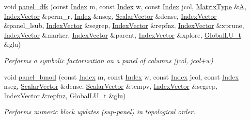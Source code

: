 \begin{DoxyCompactItemize}
void \hyperlink{group___sparse_l_u___module_acaf62fda387ea03e9caa2734e4e7b0c9}{panel\+\_\+dfs} (const \hyperlink{namespace_eigen_a62e77e0933482dafde8fe197d9a2cfde}{Index} m, const \hyperlink{namespace_eigen_a62e77e0933482dafde8fe197d9a2cfde}{Index} w, const \hyperlink{namespace_eigen_a62e77e0933482dafde8fe197d9a2cfde}{Index} jcol, \hyperlink{group___sparse_core___module}{Matrix\+Type} \&\hyperlink{group___core___module_class_eigen_1_1_matrix}{A}, \hyperlink{group___core___module}{Index\+Vector} \&perm\+\_\+r, \hyperlink{namespace_eigen_a62e77e0933482dafde8fe197d9a2cfde}{Index} \&nseg, \hyperlink{group___core___module}{Scalar\+Vector} \&dense, \hyperlink{group___core___module}{Index\+Vector} \&panel\+\_\+lsub, \hyperlink{group___core___module}{Index\+Vector} \&segrep, \hyperlink{group___core___module}{Index\+Vector} \&repfnz, \hyperlink{group___core___module}{Index\+Vector} \&xprune, \hyperlink{group___core___module}{Index\+Vector} \&marker, \hyperlink{group___core___module}{Index\+Vector} \&parent, \hyperlink{group___core___module}{Index\+Vector} \&xplore, \hyperlink{struct_eigen_1_1internal_1_1_l_u___global_l_u__t}{Global\+L\+U\+\_\+t} \&glu)
\begin{DoxyCompactList}\small\item\em Performs a symbolic factorization on a panel of columns \mbox{[}jcol, jcol+w) \end{DoxyCompactList}\item 
void \hyperlink{group___sparse_l_u___module_a277936738db49e25285164ac25c498c3}{panel\+\_\+bmod} (const \hyperlink{namespace_eigen_a62e77e0933482dafde8fe197d9a2cfde}{Index} m, const \hyperlink{namespace_eigen_a62e77e0933482dafde8fe197d9a2cfde}{Index} w, const \hyperlink{namespace_eigen_a62e77e0933482dafde8fe197d9a2cfde}{Index} jcol, const \hyperlink{namespace_eigen_a62e77e0933482dafde8fe197d9a2cfde}{Index} nseg, \hyperlink{group___core___module}{Scalar\+Vector} \&dense, \hyperlink{group___core___module}{Scalar\+Vector} \&tempv, \hyperlink{group___core___module}{Index\+Vector} \&segrep, \hyperlink{group___core___module}{Index\+Vector} \&repfnz, \hyperlink{struct_eigen_1_1internal_1_1_l_u___global_l_u__t}{Global\+L\+U\+\_\+t} \&glu)
\begin{DoxyCompactList}\small\item\em Performs numeric block updates (sup-\/panel) in topological order. \end{DoxyCompactList}\item 

\end{DoxyCompactItemize}
